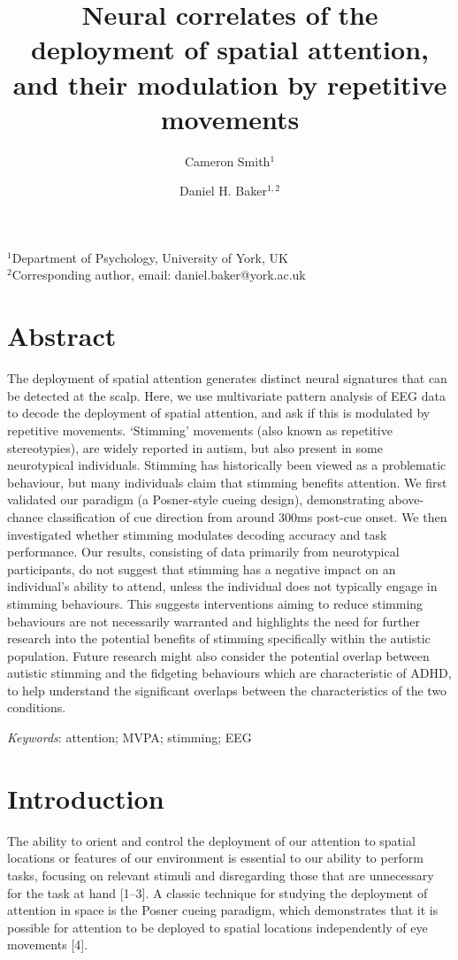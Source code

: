 \documentclass[
  letterpaper,
  DIV=11,
  numbers=noendperiod]{scrartcl}
\title{Neural correlates of the deployment of spatial attention, and
their modulation by repetitive movements}
\author{Cameron Smith\(^{1}\) \and Daniel H. Baker\(^{1,2}\)}
\date{}
\begin{document}
\maketitle

\(^1\)Department of Psychology, University of York, UK\\
\(^2\)Corresponding author, email: daniel.baker@york.ac.uk

\section{Abstract}\label{abstract}

The deployment of spatial attention generates distinct neural signatures
that can be detected at the scalp. Here, we use multivariate pattern
analysis of EEG data to decode the deployment of spatial attention, and
ask if this is modulated by repetitive movements. `Stimming' movements
(also known as repetitive stereotypies), are widely reported in autism,
but also present in some neurotypical individuals. Stimming has
historically been viewed as a problematic behaviour, but many
individuals claim that stimming benefits attention. We first validated
our paradigm (a Posner-style cueing design), demonstrating above-chance
classification of cue direction from around 300ms post-cue onset. We
then investigated whether stimming modulates decoding accuracy and task
performance. Our results, consisting of data primarily from neurotypical
participants, do not suggest that stimming has a negative impact on an
individual's ability to attend, unless the individual does not typically
engage in stimming behaviours. This suggests interventions aiming to
reduce stimming behaviours are not necessarily warranted and highlights
the need for further research into the potential benefits of stimming
specifically within the autistic population. Future research might also
consider the potential overlap between autistic stimming and the
fidgeting behaviours which are characteristic of ADHD, to help
understand the significant overlaps between the characteristics of the
two conditions.

\emph{Keywords}: attention; MVPA; stimming; EEG

\section{Introduction}\label{introduction}

The ability to orient and control the deployment of our attention to
spatial locations or features of our environment is essential to our
ability to perform tasks, focusing on relevant stimuli and disregarding
those that are unnecessary for the task at hand {[}1--3{]}. A classic
technique for studying the deployment of attention in space is the
Posner cueing paradigm, which demonstrates that it is possible for
attention to be deployed to spatial locations independently of eye
movements {[}4{]}.
\end{document}
